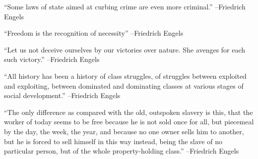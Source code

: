 \documentclass{article}%
\begin{document}
\linebreak%
\vspace{1mm}%
\begin{minipage}{\textwidth}%
\flushleft%
“Some laws of state aimed at curbing crime are even more criminal.”%
\linebreak%
\vspace{1mm}%
–Friedrich Engels%
\linebreak%
\vspace{1mm}%
\end{minipage}%
\linebreak%
\vspace{1mm}%
\begin{minipage}{\textwidth}%
\flushleft%
“Freedom is the recognition of necessity”%
\linebreak%
\vspace{1mm}%
–Friedrich Engels%
\linebreak%
\vspace{1mm}%
\end{minipage}%
\linebreak%
\vspace{1mm}%
\begin{minipage}{\textwidth}%
\flushleft%
“Let us not deceive ourselves by our victories over nature. She avenges for each such victory.”%
\linebreak%
\vspace{1mm}%
–Friedrich Engels%
\linebreak%
\vspace{1mm}%
\end{minipage}%
\linebreak%
\vspace{1mm}%
\begin{minipage}{\textwidth}%
\flushleft%
“All history has been a history of class struggles, of struggles between exploited and exploiting, between dominated and dominating classes at various stages of social development.”%
\linebreak%
\vspace{1mm}%
–Friedrich Engels%
\linebreak%
\vspace{1mm}%
\end{minipage}%
\linebreak%
\vspace{1mm}%
\begin{minipage}{\textwidth}%
\flushleft%
“The only difference as compared with the old, outspoken slavery is this, that the worker of today seems to be free because he is not sold once for all, but piecemeal by the day, the week, the year, and because no one owner sells him to another, but he is forced to sell himself in this way instead, being the slave of no particular person, but of the whole property{-}holding class.”%
\linebreak%
\vspace{1mm}%
–Friedrich Engels%
\linebreak%
\vspace{1mm}%
\end{minipage}%
\end{document}
